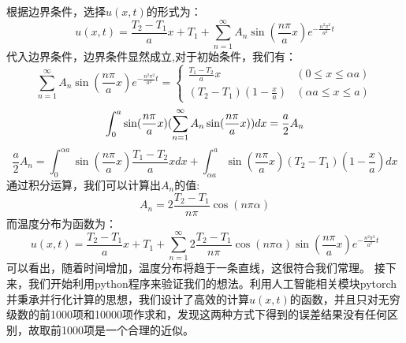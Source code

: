 \documentclass[bwprint]{cumcmthesis}
\begin{document}
    \indent 根据边界条件，选择$u(x,t)$的形式为：
    \begin{equation}
        u(x,t)=\frac{T_{2}-T_{1}}{a}x+T_{1}+\sum_{n=1}^{\infty}A_{n}\sin(\frac{n\pi}{a}x)e^{-\frac{n^{2}\pi^{2}}{a^{2}}t}
    \end{equation}
    \indent  代入边界条件，边界条件显然成立,对于初始条件，我们有：
    \begin{equation}
        \sum_{n=1}^{\infty}A_{n}\sin(\frac{n\pi}{a}x)e^{-\frac{n^{2}\pi^{2}}{a^{2}}t} = \left\{\begin{array}{cc}
        \frac{T_1-T_2}{a} x & (0\leq x \leq \alpha a)\\
        (T_2-T_1)(1-\frac{x}{a})& (\alpha a \leq x \leq a)
        \end{array} \right.
    \end{equation}
    \begin{equation}
        \centering
        \int_{0}^{a}\sin(\frac{n\pi}{a}x)(\sum_{n=1}^{\infty}A_{n}\sin(\frac{n\pi}{a}x))dx=\frac{a}{2}A_{n}
    \end{equation}
    \begin{equation}
        \frac{a}{2}A_{n}=\int_{0}^{\alpha a} \sin(\frac{n\pi}{a}x)\frac{T_1-T_2}{a} x dx + \int_{\alpha a}^{a}\sin(\frac{n\pi}{a}x)(T_2-T_1)(1-\frac{x}{a}) dx
    \end{equation}
    \indent 通过积分运算，我们可以计算出$A_{n}$的值:
    \begin{equation}
        A_n=2\frac{T_2-T_1}{n\pi} \cos(n\pi \alpha)
    \end{equation}
    \indent 而温度分布为函数为：
    \begin{equation}
        u(x,t)=\frac{T_{2}-T_{1}}{a}x+T_{1}+\sum_{n=1}^{\infty}2\frac{T_2-T_1}{n\pi} \cos(n\pi \alpha)\sin(\frac{n\pi}{a}x)e^{-\frac{n^{2}\pi^{2}}{a^{2}}t}
    \end{equation}
    \indent 可以看出，随着时间增加，温度分布将趋于一条直线，这很符合我们常理。
    \indent 接下来，我们开始利用python程序来验证我们的想法。利用人工智能相关模块pytorch并秉承并行化计算的思想，我们设计了高效的计算$u(x,t)$的函数，并且只对无穷级数的前1000项和10000项作求和，发现这两种方式下得到的误差结果没有任何区别，故取前1000项是一个合理的近似。\\
\end{document}

